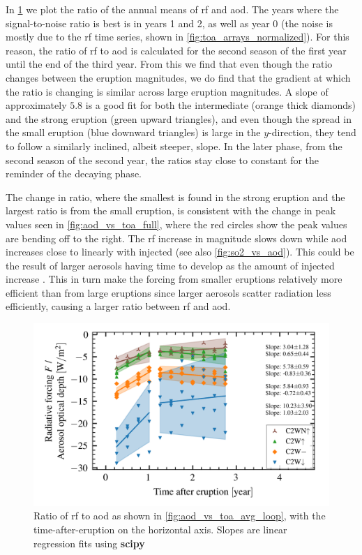 \documentclass{ametsocV5}
\begin{document}
In \cref{fig:aod_vs_toa_avg_loop_ratio} we plot the ratio of the annual means of
\acrshort{rf} and \acrshort{aod}. The years where the signal-to-noise ratio is best is
in years 1 and 2, as well as year 0 (the noise is mostly due to the \acrshort{rf} time
series, shown in \cref{fig:toa_arrays_normalized}). For this reason, the ratio of
\acrshort{rf} to \acrshort{aod} is calculated for the second season of the first year
until the end of the third year. From this we find that even though the ratio changes
between the eruption magnitudes, we do find that the gradient at which the ratio is
changing is similar across large eruption magnitudes. A slope of approximately \( 5.8 \)
is a good fit for both the intermediate (orange thick diamonds) and the strong eruption
(green upward triangles), and even though the spread in the small eruption (blue
downward triangles) is large in the \( y \)-direction, they tend to follow a similarly
inclined, albeit steeper, slope. In the later phase, from the second season of the
second year, the ratios stay close to constant for the reminder of the decaying phase.

The change in ratio, where the smallest is found in the strong eruption and the largest
ratio is from the small eruption, is consistent with the change in peak values seen in
\cref{fig:aod_vs_toa_full}, where the red circles show the peak values are bending off
to the right. The \acrshort{rf} increase in magnitude slows down while \acrshort{aod}
increases close to linearly with injected  (see also \cref{fig:so2_vs_aod}).
This could be the result of larger aerosols having time to develop as the amount of
injected  increase \citep{niemeier2015,marshall2019}. This in turn make the
forcing from smaller eruptions relatively more efficient than from large eruptions since
larger aerosols scatter radiation less efficiently, causing a larger ratio between
\acrshort{rf} and \acrshort{aod}.

\begin{figure}[t]
  \begin{center}
    \includegraphics[width=0.95\linewidth]{figures/aod_vs_toa_avg_loop_ratio.png}
  \end{center}
  \caption{
    Ratio of \acrshort{rf} to \acrshort{aod} as shown in
    \cref{fig:aod_vs_toa_avg_loop}, with the time-after-eruption on the horizontal axis.
    Slopes are linear regression fits using \textbf{scipy}
  }%
  \label{fig:aod_vs_toa_avg_loop_ratio}
\end{figure}
\end{document}
